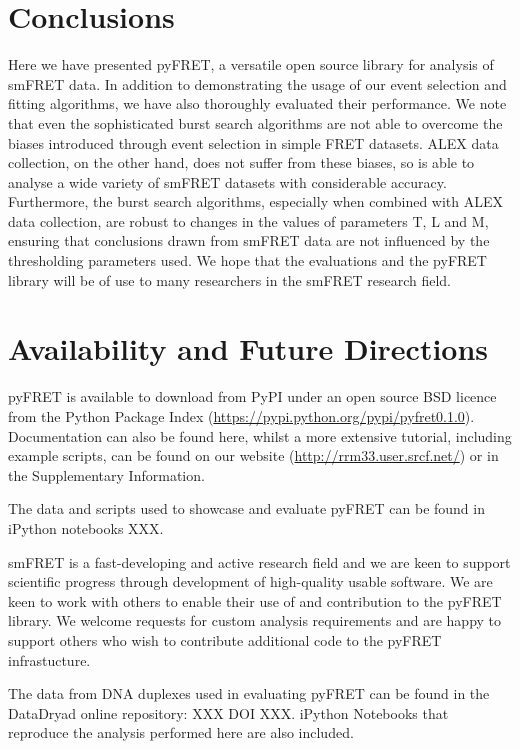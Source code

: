 \section{Conclusions}
Here we have presented pyFRET, a versatile open source library for analysis of smFRET data. In addition to demonstrating the usage of our event selection and fitting algorithms, we have also thoroughly evaluated their performance. We note that even the sophisticated burst search algorithms are not able to overcome the biases introduced through event selection in simple FRET datasets. ALEX data collection, on the other hand, does not suffer from these biases, so is able to analyse a wide variety of smFRET datasets with considerable accuracy. Furthermore, the burst search algorithms, especially when combined with ALEX data collection, are robust to changes in the values of parameters T, L and M, ensuring that conclusions drawn from smFRET data are not influenced by the thresholding parameters used. We hope that the evaluations and the pyFRET library will be of use to many researchers in the smFRET research field. 
 
\section*{Availability and Future Directions}
pyFRET is available to download from PyPI under an open source BSD licence from the Python Package Index (\url{https://pypi.python.org/pypi/pyfret0.1.0}). Documentation can also be found here, whilst a more extensive tutorial, including example scripts, can be found on our website (\url{http://rrm33.user.srcf.net/}) or in the Supplementary Information.

The data and scripts used to showcase and evaluate pyFRET can be found in iPython notebooks XXX.

smFRET is a fast-developing and active research field and we are keen to support scientific progress through development of high-quality usable software. We are keen to work with others to enable their use of and contribution to the pyFRET library. We welcome requests for custom analysis requirements and are happy to support others who wish to contribute additional code to the pyFRET infrastucture. 

The data from DNA duplexes used in evaluating pyFRET can be found in the DataDryad online repository: XXX DOI XXX. iPython Notebooks that reproduce the analysis performed here are also included.

